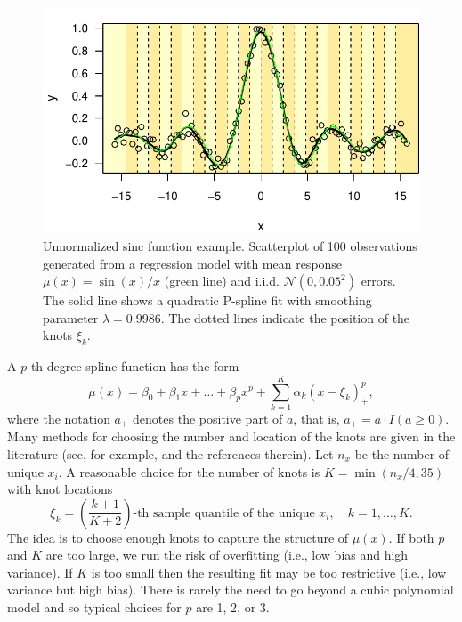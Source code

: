 \documentclass[cmfont,usenames,dvipsnames,leqno]{afit-etd}\usepackage[]{graphicx}\usepackage[]{color}
\makeatletter
\def\maxwidth{ %
  \ifdim\Gin@nat@width>\linewidth
    \linewidth
  \else
    \Gin@nat@width
  \fi
}
\newenvironment{knitrout}{}{} %
\renewenvironment{knitrout}{\begin{singlespace}}{\end{singlespace}}
\newcommand{\mc}[1]{\ensuremath{\mathcal{#1}}}
\makeatother
\begin{document}
\begin{knitrout}
\color{fgcolor}\begin{figure}[!htb]

\includegraphics[width=\maxwidth]{figure/sinc-example} \caption[Unnormalized sinc function example]{Unnormalized sinc function example. Scatterplot of 100 observations generated from a regression model with mean response $\mu(x) = \sin(x)/x$ (green line) and i.i.d. $\mc{N}(0, 0.05^2)$ errors. The solid line shows a quadratic \ac{P-spline} fit with smoothing parameter $\lambda = 0.9986$. The dotted lines indicate the position of the knots $\xi_k$.\label{fig:sinc-example}}
\end{figure}


\end{knitrout}


A $p$-th degree spline function has the form
\begin{equation}
\label{eqn:spline-model}
  \mu(x) = \beta_0 + \beta_1x + \dotsc + \beta_px^p + \sum_{k = 1}^K \alpha_k(x - \xi_k)_+^p,
\end{equation}
where the notation $a_+$ denotes the positive part of $a$, that is, $a_+ = a \cdot I(a \ge 0)$. Many methods for choosing the number and location of the knots are given in the literature (see, for example, \citet{ruppert_selecting_2002} and the references therein). Let $n_x$ be the number of unique $x_i$. A reasonable choice for the number of knots \citep[pg. 126]{ruppert_semiparametric_2003} is $K = \min(n_x/4, 35)$ with knot locations
\begin{equation*}
  \xi_k = \left(\frac{k+1}{K+2}\right)\text{-th sample quantile of the unique } x_i, \quad k = 1, \dotsc, K.
\end{equation*}
The idea is to choose enough knots to capture the structure of $\mu(x)$. If both $p$ and $K$ are too large, we run the risk of overfitting (i.e., low bias and high variance). If $K$ is too small then the resulting fit may be too restrictive (i.e., low variance but high bias). There is rarely the need to go beyond a cubic polynomial model and so typical choices for $p$ are 1, 2, or 3.
\end{document}
